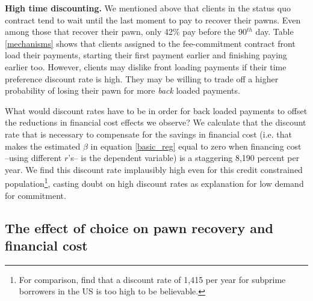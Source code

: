 \documentclass[oneside,11pt]{article}
\begin{document}
\vspace{.1in}
\noindent \textbf{High time discounting.} We mentioned above that clients in the status quo contract tend to wait until the last moment to pay to recover their pawns. Even among those that recover their pawn, only 42\% pay before the 90$^{th}$ day. Table \ref{mechanisms} shows that clients assigned to the fee-commitment contract front load their payments, starting their first payment earlier and finishing paying earlier too. However, clients may dislike front loading payments if their time preference discount rate is high. They may be willing to trade off a higher probability of losing their pawn for more \textit{back} loaded payments.  

What would discount rates have to be in order for back loaded payments to offset the reductions in financial cost effects we observe? %
We calculate that the discount rate that is necessary to compensate for the savings in financial cost (i.e. that makes the estimated $\beta$ in equation \ref{basic_reg} equal to zero when financing cost --using different $r$'s-- is the dependent variable) is a staggering 8,190 percent per year. We find this discount rate implausibly high even for this credit constrained population\footnote{For comparison, \cite{Levin} find that a discount rate of 1,415 per year for subprime borrowers in the US is too high to be believable.}, casting doubt on high discount rates as explanation for low demand for commitment. %


\vspace{.2in}
\subsection{The effect of choice on pawn recovery and financial cost} \label{effect_choice}
\end{document}
